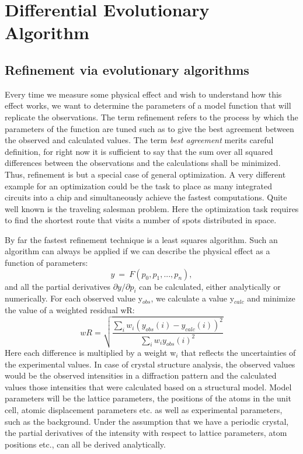 
\chapter{Differential Evolutionary Algorithm \label{diff}}
\section{Refinement via evolutionary algorithms \label{diff-evol}}

Every time we measure some physical effect and wish to understand
how this effect works, we want to determine the parameters of a 
model function that will replicate the observations. The term 
refinement refers to the process by which the parameters of the
function are tuned such as to give the best agreement between
the observed and calculated values. The term {\it best agreement}
merits careful definition, for right now it is sufficient to say
that the sum over all squared differences between the observations and the 
calculations shall be minimized. Thus, refinement is but a special
case of general optimization. A very different example for an 
optimization could be the task to place as many integrated 
circuits into a chip and simultaneously achieve the fastest computations.
Quite well known is the traveling salesman problem. Here the 
optimization task requires to find the shortest route that 
visits a number of spots distributed in space.  

By far the fastest refinement technique is a least squares algorithm.
Such an algorithm can always be applied if we can describe the 
physical effect as a function of parameters:
\begin{equation}
  y ~=~ F(p_{0}, p_{1}, ..., p_{n}),
\end{equation}
and all the partial derivatives $\partial y/ \partial p_{i}$ can 
be calculated, either analytically or numerically. For each 
observed value y$_{obs}$, we calculate a value y$_{calc}$ and 
minimize the value of a weighted residual wR:
\begin{equation}
   wR = \sqrt{\frac{\sum_{i} w_{i} (y_{obs}(i) - y_{calc}(i))^2}
                   {\sum_{i} w_{i} y_{obs}(i)^2}}
\end{equation}
Here each difference is multiplied by a weight w$_{i}$ that reflects
the uncertainties of the experimental values. In case of crystal 
structure analysis, the observed values would be the observed 
intensities in a diffraction pattern and the calculated values 
those intensities that were calculated based on a structural model. 
Model parameters will be the lattice parameters, the positions
of the atoms in the unit cell, atomic displacement parameters etc.
as well as experimental parameters, such as the background.
Under the assumption that we have a periodic crystal, the 
partial derivatives of the intensity with respect to lattice
parameters, atom positions etc., can all be derived analytically.

